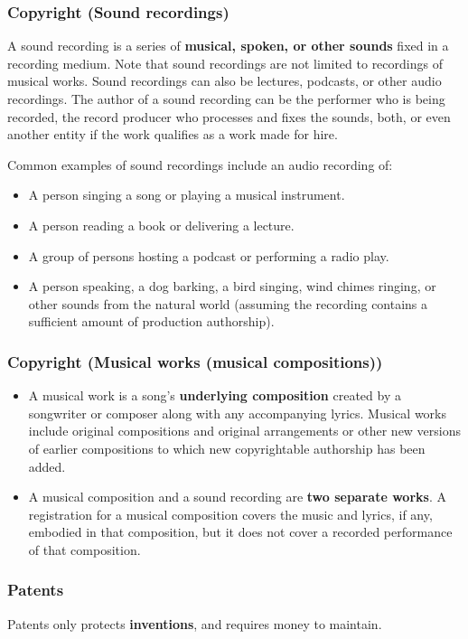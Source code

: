 \documentclass[11pt]{article}
\begin{document}
\subsubsection{Copyright (Sound recordings)}
\label{sec:org4708b4f}
A sound recording is a series of \textbf{musical, spoken, or other sounds} fixed in a recording medium. Note that sound recordings are not limited to recordings of musical works. Sound recordings can also be lectures, podcasts, or other audio recordings. The author of a sound recording can be the performer who is being recorded, the record producer who processes and fixes the sounds, both, or even another entity if the work qualifies as a work made for hire.

Common examples of sound recordings include an audio recording of:
\begin{itemize}
\item A person singing a song or playing a musical instrument.
\item A person reading a book or delivering a lecture.
\item A group of persons hosting a podcast or performing a radio play.
\item A person speaking, a dog barking, a bird singing, wind chimes ringing, or other sounds from the natural world (assuming the recording contains a sufficient amount of production authorship).
\end{itemize}

 \newpage

\subsubsection{Copyright (Musical works (musical compositions))}
\label{sec:org7f8083d}
\begin{itemize}
\item A musical work is a song's \textbf{underlying composition} created by a songwriter or composer along with any accompanying lyrics. Musical works include original compositions and original arrangements or other new versions of earlier compositions to which new copyrightable authorship has been added.
\item A musical composition and a sound recording are \textbf{two separate works}. A registration for a musical composition covers the music and lyrics, if any, embodied in that composition, but it does not cover a recorded performance of that composition.
\end{itemize}

\subsubsection{Patents}
\label{sec:orgc95bf27}
Patents only protects \textbf{inventions}, and requires money to maintain.
\end{document}
